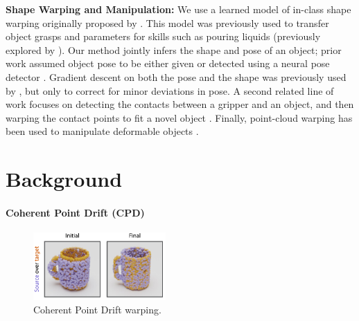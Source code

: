 \documentclass{article}
\begin{document}
\textbf{Shape Warping and Manipulation:} We use a learned model of in-class shape warping originally proposed by \citet{rodriguez18learning}. This model was previously used to transfer object grasps \cite{rodriguez18transferring,rodriguez18transferringa,klamt18supervised} and parameters for skills such as pouring liquids \cite{thompson21shapebased} (previously explored by \cite{brandi14generalizing}). Our method jointly infers the shape and pose of an object; prior work assumed object pose to be either given \cite{thompson21shapebased} or detected using a neural pose detector \cite{klamt18supervised}. Gradient descent on both the pose and the shape was previously used by \citet{rodriguez18transferring,rodriguez18transferringa}, but only to correct for minor deviations in pose. A second related line of work focuses on detecting the contacts between a gripper and an object, and then warping the contact points to fit a novel object \cite{li07datadriven,benamor12generalization,hillenbrand12transferring,jakel12learning,stouraitis15functional,rodriguez18learning,pavlichenko19autonomous,tian19transferring}. Finally, point-cloud warping has been used to manipulate deformable objects \cite{lee15learning,schulman16learning}.

\section{Background}
\label{sec:background}

\paragraph{Coherent Point Drift (CPD)}

\begin{figure}
    \centering
    \vspace{-2.5em}
    \includegraphics[width=0.45\textwidth]{figures/warping_small.pdf}
    \caption{Coherent Point Drift warping.}
    \label{fig:warping}
\end{figure}
\end{document}
